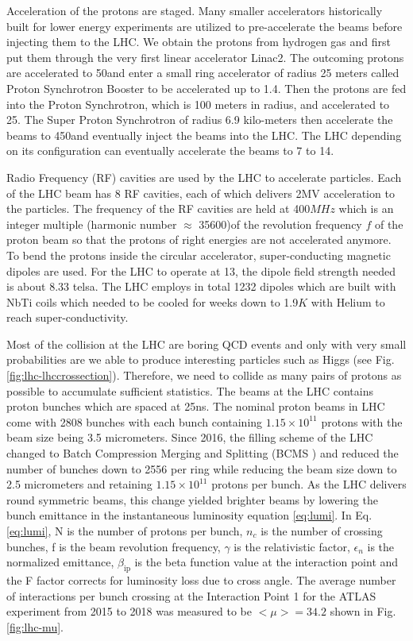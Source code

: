 Acceleration of the protons are staged. Many smaller accelerators historically built for lower energy experiments are utilized to pre-accelerate the beams before injecting them to the LHC. We obtain the protons from hydrogen gas and first put them through the very first linear accelerator Linac2. The outcoming protons are accelerated to 50\mev and enter a small ring accelerator of radius 25 meters called Proton Synchrotron Booster to be accelerated up to 1.4\gev. Then the protons are fed into the Proton Synchrotron, which is 100 meters in radius, and accelerated to 25\gev. The Super Proton Synchrotron of radius 6.9 kilo-meters then accelerate the beams to 450\gev and eventually inject the beams into the LHC. The LHC depending on its configuration can eventually accelerate the beams to 7 to 14\tev.

Radio Frequency (RF) cavities are used by the LHC to accelerate particles. Each of the LHC beam has 8 RF cavities, each of which delivers 2MV acceleration to the particles. The frequency of the RF cavities are held at 400$MHz$ which is an integer multiple (harmonic number $\approx$ 35600)of the revolution frequency $f$ of the proton beam so that the protons of right energies are not accelerated anymore. To bend the protons inside the circular accelerator, super-conducting magnetic dipoles are used. For the LHC to operate at 13\tev, the dipole field strength needed is about 8.33 telsa. The LHC employs in total 1232 dipoles which are built with NbTi coils which needed to be cooled for weeks down to 1.9$K$ with Helium to reach super-conductivity.

Most of the collision at the LHC are boring QCD events and only with very small probabilities are we able to produce interesting particles such as Higgs (see Fig.\ref{fig:lhc-lhccrossection}). Therefore, we need to collide as many pairs of protons as possible to accumulate sufficient statistics. The beams at the LHC contains proton bunches which are spaced at 25ns. The nominal proton beams in LHC come with 2808 bunches with each bunch containing $1.15\times 10^{11}$ protons with the beam size being 3.5 micrometers. Since 2016, the filling scheme of the LHC changed to Batch Compression Merging and Splitting (BCMS \cite{BCMS}) and reduced the number of bunches down to 2556 per ring while reducing the beam size down to 2.5 micrometers and retaining $1.15\times 10^{11}$ protons per bunch. As the LHC delivers round symmetric beams, this change yielded brighter beams by lowering the bunch emittance in the instantaneous luminosity equation \ref{eq:lumi}. In Eq.\ref{eq:lumi}, N is the number of protons per bunch, $n_c$ is the number of crossing bunches, f is the beam revolution frequency, $\gamma$ is the relativistic factor, $\epsilon_n$ is the normalized emittance, $\beta_{\text{ip}}$ is the beta function value at the interaction point and the F factor corrects for luminosity loss due to cross angle. The average number of interactions per bunch crossing at the Interaction Point 1 for the ATLAS experiment from 2015 to 2018 was measured to be $<\mu>=34.2$ shown in Fig.\ref{fig:lhc-mu}. 


